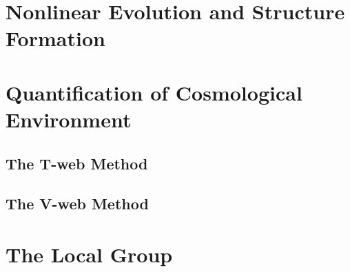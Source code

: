 



\section{Nonlinear Evolution and Structure Formation}
\label{sec:NonlinearEvolutionAndStructureFormation}




\section{Quantification of Cosmological Environment}
\label{sec:QuantificationOfCosmologicalEnvironment}


	\subsection{The T-web Method}
	\label{subsec:TheT-webMethod}


	\subsection{The V-web Method}
	\label{subsec:TheV-webMethod}






\section{The Local Group}
\label{sec:TheLocalGroup}
